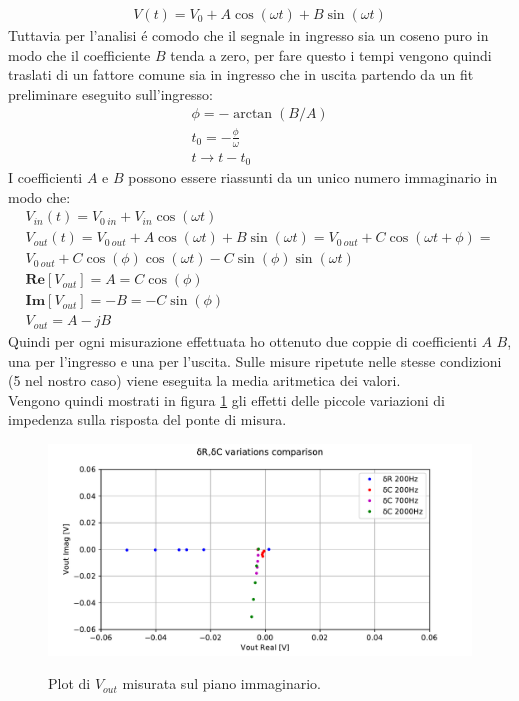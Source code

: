 \begin{gather}
	V(t)=V_0+A \cos (\omega t)+B \sin (\omega t)
\end{gather}
Tuttavia per l'analisi \'e comodo che il segnale in ingresso sia un coseno puro in modo che il coefficiente $B$ tenda a zero, per fare questo i tempi vengono quindi traslati di un fattore comune sia in ingresso che in uscita partendo da un fit preliminare eseguito sull'ingresso:
\begin{gather}
	\phi=-\arctan (B/A) \\
	t_0=-\frac{\phi}{\omega} \\
	t \rightarrow t-t_0
\end{gather}
I coefficienti $A$ e $B$ possono essere riassunti da un unico numero immaginario in modo che:
\begin{gather}
	V_{in}(t)=V_{0\ in}+V_{in}\cos (\omega t) \\
	V_{out}(t)=V_{0\ out}+A\cos (\omega t)+B\sin (\omega t)= V_{0\ out}+C \cos (\omega t+\phi) =\\
	\nonumber V_{0\ out}+C\cos (\phi)\cos (\omega t) -C \sin (\phi) \sin (\omega t) \\
	\mathbf{Re}[V_{out}]=A=C\cos (\phi) \\
	\mathbf{Im}[V_{out}]=-B=-C\sin (\phi) \\
	V_{out}=A-jB
\end{gather}
Quindi per ogni misurazione effettuata ho ottenuto due coppie di coefficienti $A$ $B$, una per l'ingresso e una per l'uscita.
Sulle misure ripetute nelle stesse condizioni (5 nel nostro caso) viene eseguita la media aritmetica dei valori.\\
Vengono quindi mostrati in figura \ref{fig:complan} gli effetti delle piccole variazioni di impedenza sulla risposta del ponte di misura.
\begin{figure}[h]
	\centering
    \includegraphics[width=\textwidth]{Figure_7.pdf}
    \label{fig:complan}
    \caption{Plot di $V_{out}$ misurata sul piano immaginario.}
\end{figure}
